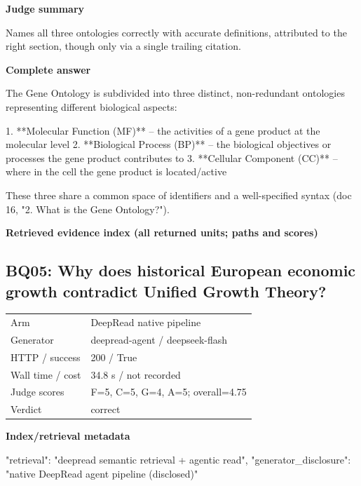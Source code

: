 \documentclass[10pt]{article}
\begin{document}
\textbf{Judge summary}
\begin{EvidenceText}
Names all three ontologies correctly with accurate definitions, attributed to the right section, though only via a single trailing citation.
\end{EvidenceText}

\textbf{Complete answer}
\begin{AnswerText}
The Gene Ontology is subdivided into three distinct, non-redundant ontologies representing different biological aspects:

1. **Molecular Function (MF)** -- the activities of a gene product at the molecular level
2. **Biological Process (BP)** -- the biological objectives or processes the gene product contributes to
3. **Cellular Component (CC)** -- where in the cell the gene product is located/active

These three share a common space of identifiers and a well-specified syntax (doc 16, "2. What is the Gene Ontology?").
\end{AnswerText}

\textbf{Retrieved evidence index (all returned units; paths and scores) }
\begin{EvidenceText}
\end{EvidenceText}
\subsection{BQ05: Why does historical European economic growth contradict Unified Growth Theory?}
\begin{tabular}{@{}ll@{}}
Arm & DeepRead native pipeline\\
Generator & deepread-agent / deepseek-flash\\
HTTP / success & 200 / True\\
Wall time / cost & 34.8 s / not recorded\\
Judge scores & F=5, C=5, G=4, A=5; overall=4.75\\
Verdict & correct\\
\end{tabular}

\textbf{Index/retrieval metadata}
\begin{EvidenceText}
{
  "retrieval": "deepread semantic retrieval + agentic read",
  "generator_disclosure": "native DeepRead agent pipeline (disclosed)"
}
\end{EvidenceText}
\end{document}
